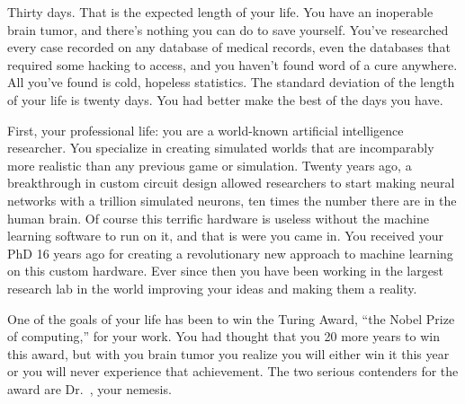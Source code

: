 \documentclass[char]{guildcamp1}
\begin{document}
\name{\cScientist{}}

Thirty days.  That is the expected length of your life.  You have an inoperable brain tumor, and there's nothing you can do to save yourself.  You've researched every case recorded on any database of medical records, even the databases that required some hacking to access, and you haven't found word of a cure anywhere.  All you've found is cold, hopeless statistics.  The standard deviation of the length of your life is twenty days.  You had better make the best of the days you have.

First, your professional life: you are a world-known artificial intelligence researcher. You specialize in creating simulated worlds that are incomparably more realistic than any previous game or simulation.  Twenty years ago, a breakthrough in custom circuit design allowed researchers to start making neural networks with a trillion simulated neurons, ten times the number there are in the human brain.  Of course this terrific hardware is useless without the machine learning software to run on it, and that is were you came in.  You received your PhD  16 years ago for creating a revolutionary new approach to machine learning on this custom hardware.  Ever since then you have been working in the largest research lab in the world improving your ideas and making them a reality.

One of the goals of your life has been to win the Turing Award, ``the Nobel Prize of computing,'' for your work.  You had thought that you 20 more years to win this award, but with you brain tumor you realize you will either win it this year or you will never experience that achievement.  The two serious contenders for the award are Dr.~\cRival{\intro{}}, your nemesis.  
\end{document}
